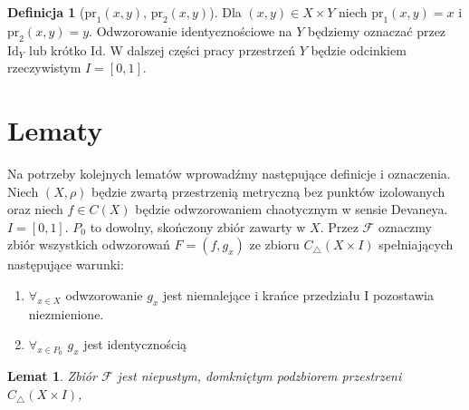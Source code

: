 \documentclass[licencjacka]{pwr_wmat_praca_dyplomowa}
\theoremstyle{plain}
\numberwithin{theorem}{chapter}
\newtheorem{lemma}[theorem]{Lemat}
\theoremstyle{definition}
\numberwithin{theorem}{chapter}
\newtheorem{definition}[theorem]{Definicja}
\begin{document}
\begin{definition}[$\textrm{pr}_1(x, y)$, $\textrm{pr}_2(x, y)$]
Dla $(x, y) \in X \times Y$ niech $\textrm{pr}_1(x, y) = x$ i $\textrm{pr}_2(x, y) = y$. Odwzorowanie identycznościowe na $Y$ będziemy oznaczać przez $\textrm{Id}_Y$ lub krótko $\textrm{Id}$. W dalszej części pracy przestrzeń $Y$ będzie odcinkiem rzeczywistym $I = [0, 1]$.
\end{definition}





\section{Lematy}

Na potrzeby kolejnych lematów wprowadźmy następujące definicje i oznaczenia.
Niech $(X, \rho)$ będzie zwartą przestrzenią metryczną bez punktów izolowanych oraz niech $f \in C(X)$ będzie odwzorowaniem chaotycznym w sensie Devaneya.
$I = [0, 1].$
$P_0$ to dowolny, skończony zbiór zawarty w $X.$ Przez $\mathcal{F}$ oznaczmy zbiór wszystkich odwzorowań $F = (f, g_x)$ ze zbioru $C_\triangle(X \times I)$ spełniających następujące warunki:
\begin{enumerate}
\item $\forall_{x \in X}$ odwzorowanie $g_x$ jest niemalejące i krańce przedziału I pozostawia niezmienione.
\item $\forall_{x \in P_0}$ $g_x$ jest identycznością 
\end{enumerate}


\begin{lemma} \label{F_jest_niepustym_domknietym_podzbiorem_trojkatnych}
Zbiór $\mathcal{F}$ jest niepustym, domkniętym podzbiorem przestrzeni $C_{\triangle}(X \times I)$, 
\end{lemma}
\end{document}
